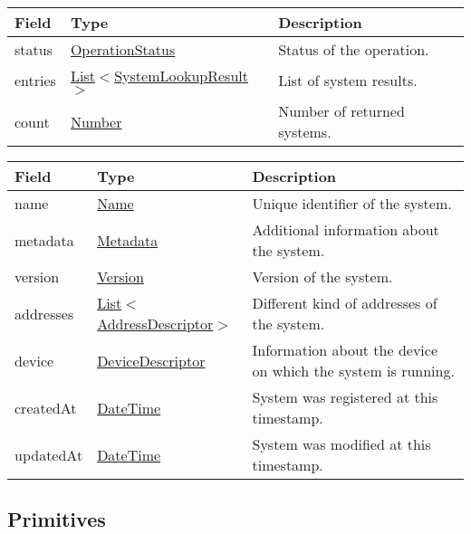 \documentclass[a4paper]{arrowhead}
\newcommand{\pref}[1]{{\textcolor{ArrowheadGrey}{\hyperref[sec:model:primitives:#1]{#1}}}}
\begin{document}
\label{sec:model:SystemLookupResponse}

\begin{table}[ht!]
\begin{tabularx}{\textwidth}{| p{3cm} | p{6cm} | X |} \hline
\rowcolor{gray!33} Field & Type      & Description \\ \hline
status & \pref{OperationStatus} & Status of the operation. \\ \hline
entries & \pref{List}$<$\hyperref[sec:model:SystemLookupResult]{SystemLookupResult}$>$     & List of system results. \\ \hline
count & \pref{Number} & Number of returned systems. \\ \hline
\end{tabularx}
\end{table}

\label{sec:model:SystemLookupResult}
 
\begin{table}[ht!]
\begin{tabularx}{\textwidth}{| p{4.25cm} | p{4cm} | X |} \hline
\rowcolor{gray!33} Field & Type      & Description \\ \hline
name & \pref{Name} & Unique identifier of the system. \\ \hline
metadata & \hyperref[sec:model:Metadata]{Metadata} & Additional information about the system. \\ \hline
version & \pref{Version} & Version of the system. \\ \hline
addresses &  \pref{List}$<$\hyperref[sec:model:AddressDescriptor]{AddressDescriptor}$>$ & Different kind of addresses of the system.  \\ \hline
device & \hyperref[sec:model:DeviceDescriptor]{DeviceDescriptor} & Information about the device on which the system is running. \\ \hline
createdAt & \pref{DateTime} & System was registered at this timestamp. \\ \hline
updatedAt & \pref{DateTime} & System was modified at this timestamp. \\ \hline
\end{tabularx}
\end{table}

\subsection{Primitives}
\label{sec:model:primitives}
\end{document}
